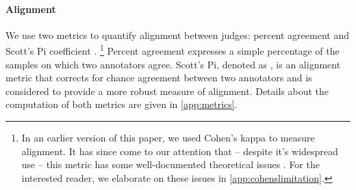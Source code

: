 %
%

\paragraph{Alignment} \label{subsec:alignment}
We use two metrics to quantify alignment between judges: percent agreement and Scott's Pi coefficient \citep{scott1995scottspi}.%
\footnote{In an earlier version of this paper, we used Cohen's kappa \citep{cohen1960kappa} to measure alignment.
It has since come to our attention that -- despite it's widespread use -- this metric has some well-documented theoretical issues \citep[e.g.][]{pontius2011death,chicco2021matthews}.
For the interested reader, we elaborate on these issues in \cref{app:cohenslimitation}.
}
Percent agreement expresses a simple percentage of the samples on which two annotators agree. 
Scott's Pi, denoted as \scottspi, is an alignment metric that corrects for chance agreement between two annotators and is considered to provide a more robust measure of alignment.
Details about the computation of both metrics are given in \cref{app:metrics}.


